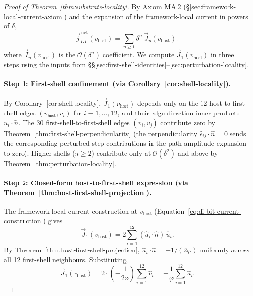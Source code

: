 \documentclass[11pt,letterpaper]{article}
\newcommand{\phig}{\varphi}
\newcommand{\vhost}{v_{\text{host}}}
\newcommand{\jDInet}{\vec{j}_{DI}^{\,\text{net}}}
\newcommand{\bigO}[1]{\mathcal{O}(#1)}
\begin{document}
\begin{proof}[Proof of Theorem~\ref{thm:substrate-locality}]
By Axiom MA.2 (\S\ref{sec:framework-local-current-axiom}) and the expansion of the framework-local current in powers of $\delta$,
\begin{equation}
\jDInet(\vhost) = \sum_{n \ge 1} \delta^n \, \vec{J}_n(\vhost),
\label{eq:current-expansion}
\end{equation}
where $\vec{J}_n(\vhost)$ is the $\bigO{\delta^n}$ coefficient. We compute $\vec{J}_1(\vhost)$ in three steps using the inputs from \S\S\ref{sec:first-shell-identities}--\ref{sec:perturbation-locality}.

\paragraph{Step 1: First-shell confinement (via Corollary~\ref{cor:shell-locality}).}
By Corollary~\ref{cor:shell-locality}, $\vec{J}_1(\vhost)$ depends only on the 12 host-to-first-shell edges $(\vhost, v_i)$ for $i = 1, \ldots, 12$, and their edge-direction inner products $\hat{u}_i \cdot \hat{n}$. The 30 first-shell-to-first-shell edges $(v_i, v_j)$ contribute zero by Theorem~\ref{thm:first-shell-perpendicularity} (the perpendicularity $\hat{e}_{ij} \cdot \hat{n} = 0$ sends the corresponding perturbed-step contributions in the path-amplitude expansion to zero). Higher shells ($n \ge 2$) contribute only at $\bigO{\delta^2}$ and above by Theorem~\ref{thm:perturbation-locality}.

\paragraph{Step 2: Closed-form host-to-first-shell expression (via Theorem~\ref{thm:host-first-shell-projection}).}
The framework-local current construction at $\vhost$ (Equation~\eqref{eq:di-bit-current-construction}) gives
\[
\vec{J}_1(\vhost) = 2 \sum_{i=1}^{12} (\hat{u}_i \cdot \hat{n}) \, \hat{u}_i.
\]
By Theorem~\ref{thm:host-first-shell-projection}, $\hat{u}_i \cdot \hat{n} = -1/(2\phig)$ uniformly across all 12 first-shell neighbours. Substituting,
\[
\vec{J}_1(\vhost) = 2 \cdot \left(-\frac{1}{2\phig}\right) \sum_{i=1}^{12} \hat{u}_i = -\frac{1}{\phig} \sum_{i=1}^{12} \hat{u}_i.
\]


\end{proof}
\end{document}
